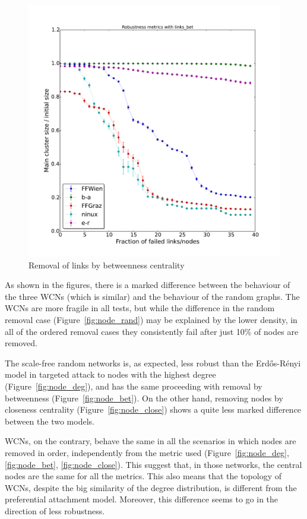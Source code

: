 \documentclass[a4paper,11pt,twoside,openleft]{memoir}
\newcommand{\figref}[1] {Figure~\ref{#1}}
\begin{document}
\begin{figure}[htbp]
\centering
\includegraphics{graphs/links_bet_robustness}
\caption{Removal of links by betweenness centrality}
\label{fig:link_bet}
\end{figure}

As shown in the figures, there is a marked difference between the
behaviour of the three WCNs (which is similar) and the behaviour of the
random graphs. The WCNs are more fragile in all tests, but while the
difference in the random removal case (\figref{fig:node_rand}) may be
explained by the lower density, in all of the ordered removal cases they
consistently fail after just 10\% of nodes are removed.

The scale-free random networks is, as expected, less robust than the
Erd\H{o}s-Rényi model in targeted attack to nodes with the highest
degree (\figref{fig:node_deg}), and has the same proceeding with removal
by betweenness (\figref{fig:node_bet}). On the
other hand, removing nodes by closeness centrality (\figref{fig:node_close})
shows a quite less marked difference between the two models.

WCNs, on the contrary, behave the same in all the scenarios in which
nodes are removed in order, independently from the metric used
(\figref{fig:node_deg}, \ref{fig:node_bet}, \ref{fig:node_close}). This
suggest that, in those networks, the central nodes are the same for all
the metrics. This also means that the topology of WCNs, despite the big
similarity of the degree distribution, is different from the
preferential attachment model. Moreover, this difference seems to go in
the direction of less robustness.
\end{document}
